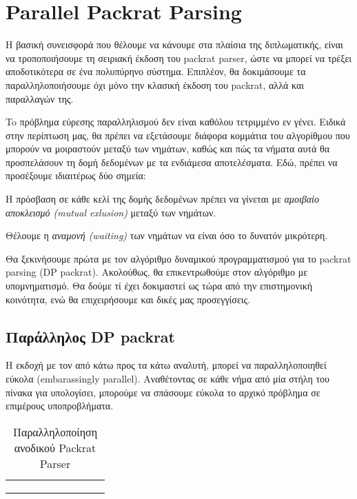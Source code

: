 \chapter{ Parallel Packrat Parsing }
\label{ch:parallel}

Η βασική συνεισφορά που θέλουμε να κάνουμε στα πλαίσια της διπλωματικής, είναι να τροποποιήσουμε τη σειριακή έκδοση του packrat parser, ώστε να μπορεί να τρέξει αποδοτικότερα σε ένα πολυπύρηνο σύστημα.
Επιπλέον, θα δοκιμάσουμε τα παραλληλοποιήσουμε όχι μόνο την κλασική έκδοση του packrat, αλλά και παραλλαγών της.

To πρόβλημα εύρεσης παραλληλισμού δεν είναι καθόλου τετριμμένο εν γένει. 
Ειδικά στην περίπτωση μας, θα πρέπει να εξετάσουμε διάφορα κομμάτια του αλγορίθμου που μπορούν να μοιραστούν μεταξύ των νημάτων, καθώς και πώς τα νήματα αυτά θα προσπελάσουν τη δομή δεδομένων με τα ενδιάμεσα αποτελέσματα.
Εδώ, πρέπει να προσέξουμε ιδιαιτέρως δύο σημεία:

\begin{description}[font=$\bullet$\scshape\bfseries]
	\item Η πρόσβαση σε κάθε κελί της δομής δεδομένων πρέπει να γίνεται με \textit{αμοιβαίο αποκλεισμό (mutual exlusion)} μεταξύ των νημάτων.
	\item Θέλουμε η \textit{αναμονή (waiting)} των νημάτων να είναι όσο το δυνατόν μικρότερη.
\end{description}

Θα ξεκινήσουμε πρώτα με τον αλγόριθμο δυναμικού προγραμματισμού για το packrat parsing (DP packrat).
Ακολούθως, θα επικεντρωθούμε στον αλγόριθμο με υπομνηματισμό.
Θα δούμε τί έχει δοκιμαστεί ως τώρα από την επιστημονική κοινότητα, ενώ θα επιχειρήσουμε και δικές μας προσεγγίσεις.

\section{Παράλληλος DP packrat}

Η εκδοχή με τον από κάτω προς τα κάτω αναλυτή, μπορεί να παραλληλοποιηθεί εύκολα (embarassingly parallel). 
Αναθέτοντας σε κάθε νήμα από μία στήλη του πίνακα για υπολογίσει, μπορούμε να σπάσουμε εύκολα το αρχικό πρόβλημα σε επιμέρους υποπροβλήματα.

\begin{table}[ht]
\begin{center}
  \begin{tabular}{|c|c|c|g|g|g|g|c|c|}
    \hline
     & & & & & & & &  \\ \hline \hline
     & & & & & & & &  \\ \hline \hline
     & & & & & & & &  \\ \hline \hline
     & & & & & & & &  \\ \hline
  \end{tabular}
\end{center}
\caption{Παραλληλοποίηση ανοδικού Packrat Parser}
    \label{tab:bottom_up}
\end{table}

